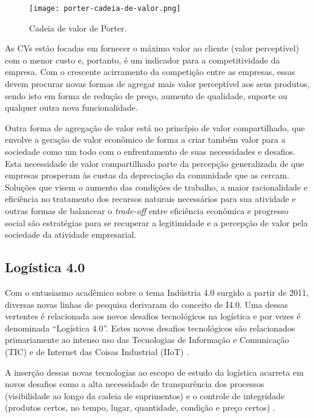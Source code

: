 	\begin{figure}[htb]
		\centering
		\caption{Cadeia de valor de Porter.}
		\label{fig:porter-cadeia-de-valor}
		\texttt{[image: porter-cadeia-de-valor.png]}
	\end{figure}
	
	As CVs estão focadas em fornecer o máximo valor ao cliente (valor perceptível) com o menor custo e, portanto, é um indicador para a competitividade da empresa. Com o crescente acirramento da competição entre as empresas, essas devem procurar novas formas de agregar mais valor perceptível aos seus produtos, sendo isto em forma de redução de preço, aumento de qualidade, suporte ou qualquer outra nova funcionalidade.
	
	Outra forma de agregação de valor está no princípio de valor compartilhado, que envolve a geração de valor econômico de forma a criar também valor para a sociedade como um todo \cite{porter2011valorcompartilhado} com o enfrentamento de suas necessidades e desafios. Esta necessidade de valor compartilhado parte da percepção generalizada de que empresas prosperam às custas da depreciação da comunidade que as cercam. Soluções que visem o aumento das condições de trabalho, a maior racionalidade e eficiência no tratamento dos recursos naturais necessários para sua atividade e outras formas de balancear o \textit{trade-off} entre eficiência econômica e progresso social são estratégias para se recuperar a legitimidade e a percepção de valor pela sociedade da atividade empresarial.
	
\subsection{Logística 4.0}
	
	Com o entusiasmo acadêmico sobre o tema Indústria 4.0 surgido a partir de 2011, diversas novas linhas de pesquisa derivaram do conceito de I4.0. Uma dessas vertentes é relacionada aos novos desafios tecnológicos na logística e por vezes é denominada ``Logística 4.0''. Estes novos desafios tecnológicos são relacionados primariamente ao intenso uso das Tecnologias de Informação e Comunicação (TIC) e de Internet das Coisas Industrial (IIoT) \cite{barreto2017industry}.
	
	A inserção dessas novas tecnologias ao escopo de estudo da logística acarreta em novos desafios como a alta necessidade de transparência dos processos (visibilidade ao longo da cadeia de suprimentos) e o controle de integridade (produtos certos, no tempo, lugar, quantidade, condição e preço certos) \cite{barreto2017industry}.

